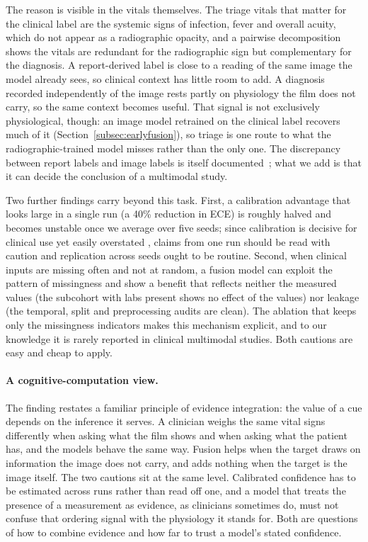 \documentclass[twocolumn, final]{svjour3}
\begin{document}
The reason is visible in the vitals themselves. The triage vitals that matter for the
clinical label are the systemic signs of infection, fever and overall acuity, which do not
appear as a radiographic
opacity, and a pairwise decomposition shows the vitals are redundant for the radiographic
sign but complementary for the diagnosis. A report-derived label is close to a reading of the
same image the model already sees, so clinical context has little room to add. A diagnosis
recorded independently of the image rests partly on physiology the film does not carry, so
the same context becomes useful. That signal is not exclusively physiological, though: an
image model retrained on the clinical label recovers much of it
(Section~\ref{subsec:earlyfusion}), so triage is one route to what the radiographic-trained
model misses rather than the only one. The discrepancy between report labels and image labels
is itself documented~\citep{jain2021visualchexbert}; what we add is that it can decide the
conclusion of a multimodal study.

Two further findings carry beyond this task. First, a calibration advantage that
looks large in a single run (a 40\% reduction in ECE) is roughly halved and becomes
unstable once we average over five seeds; since calibration is decisive for clinical use
yet easily overstated \citep{vancalster2019calibration}, claims from one run should be read
with caution and replication across seeds ought to be routine. Second, when
clinical inputs are missing often and not at random, a fusion model can exploit the
pattern of missingness and show a benefit that reflects neither the measured values
(the subcohort with labs present shows no effect of the values) nor leakage (the
temporal, split and preprocessing audits are clean). The ablation that keeps only the
missingness indicators makes this mechanism explicit, and to our knowledge it is
rarely reported in clinical multimodal studies. Both cautions are easy and cheap to
apply.

\paragraph{A cognitive-computation view.} The finding restates a familiar principle of
evidence integration: the value of a cue depends on the inference it serves. A clinician
weighs the same vital signs differently when asking what the film shows and when asking what
the patient has, and the models behave the same way. Fusion helps when the target draws on
information the image does not carry, and adds nothing when the target is the image itself.
The two cautions sit at the same level. Calibrated confidence has to be estimated across runs
rather than read off one, and a model that treats the presence of a measurement as evidence,
as clinicians sometimes do, must not confuse that ordering signal with the physiology it
stands for. Both are questions of how to combine evidence and how far to trust a model's
stated confidence.
\end{document}
